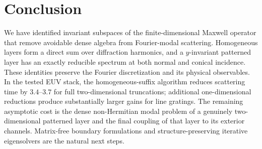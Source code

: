 \documentclass[11pt]{article}
\theoremstyle{remark}
\begin{document}
\section{Conclusion}
\label{sec:conc}

We have identified invariant subspaces of the finite-dimensional Maxwell
operator that remove avoidable dense algebra from Fourier-modal scattering.
Homogeneous layers form a direct sum over diffraction harmonics, and a
$y$-invariant patterned layer has an exactly reducible spectrum at both normal
and conical incidence.  These identities preserve the Fourier discretization
and its physical observables.  In the tested EUV stack, the homogeneous-suffix
algorithm reduces scattering time by $3.4$--$3.7$ for full two-dimensional
truncations; additional one-dimensional reductions produce substantially
larger gains for line gratings.  The remaining asymptotic cost is the dense
non-Hermitian modal problem of a genuinely two-dimensional patterned layer and
the final coupling of that layer to its exterior channels.  Matrix-free
boundary formulations and structure-preserving iterative eigensolvers are the
natural next steps.

\printbibliography
\end{document}
